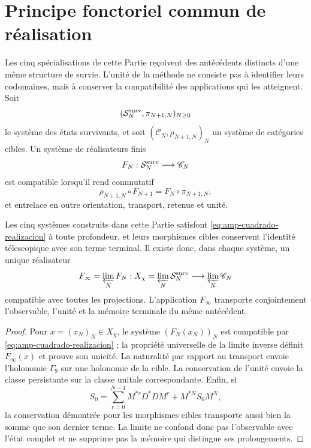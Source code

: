 \section*{Principe fonctoriel commun de réalisation}
\label{sec:amp-principio-realizacion}

Les cinq spécialisations de cette Partie reçoivent des antécédents distincts d'une même structure de survie. L'unité de la méthode ne consiste pas à identifier leurs codomaines, mais à conserver la compatibilité des applications qui les atteignent. Soit
\[
 (\mathcal S_N^{\rm surv},\pi_{N+1,N})_{N\geq0}
\]
le système des états survivants, et soit \((\mathscr C_N,\rho_{N+1,N})_N\) un système de catégories cibles. Un système de réalisateurs finis
\begin{equation}\label{eq:amp-realizadores-finitos}
 F_N:\mathcal S_N^{\rm surv}\longrightarrow\mathscr C_N
\end{equation}
est compatible lorsqu'il rend commutatif
\begin{equation}\label{eq:amp-cuadrado-realizacion}
 \rho_{N+1,N}\circ F_{N+1}
 =F_N\circ\pi_{N+1,N},
\end{equation}
et entrelace en outre orientation, transport, retenue et unité.

\begin{theorem}
\label{thm:amp-principio-realizacion}
Les cinq systèmes construits dans cette Partie satisfont \eqref{eq:amp-cuadrado-realizacion} à toute profondeur, et leurs morphismes cibles conservent l'identité télescopique avec son terme terminal. Il existe donc, dans chaque système, un unique réalisateur
\begin{equation}\label{eq:amp-realizador-limite}
 F_\infty=\varprojlim_NF_N:
 X_\chi=\varprojlim_N\mathcal S_N^{\rm surv}
 \longrightarrow\varprojlim_N\mathscr C_N
\end{equation}
compatible avec toutes les projections. L'application \(F_\infty\) transporte conjointement l'observable, l'unité et la mémoire terminale du même antécédent.
\end{theorem}

\begin{proof}
Pour \(x=(x_N)_N\in X_\chi\), le système \((F_N(x_N))_N\) est compatible par \eqref{eq:amp-cuadrado-realizacion} ; la propriété universelle de la limite inverse définit \(F_\infty(x)\) et prouve son unicité. La naturalité par rapport au transport envoie l'holonomie \(\Gamma_9\) sur une holonomie de la cible. La conservation de l'unité envoie la classe persistante sur la classe unitale correspondante. Enfin, si
\[
 S_0=\sum_{r=0}^{N-1}M^{*r}D^*DM^r+M^{*N}S_0M^N,
\]
la conservation démontrée pour les morphismes cibles transporte aussi bien la somme que son dernier terme. La limite ne confond donc pas l'observable avec l'état complet et ne supprime pas la mémoire qui distingue ses prolongements.
\end{proof}

